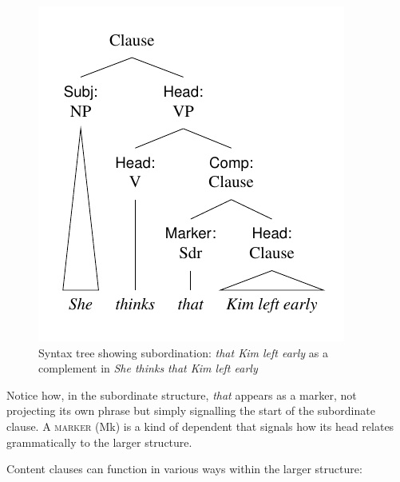 \begin{figure}
    \centering
    \includegraphics[width=0.55\linewidth]{figures/she thinks that kim left.pdf}
    \caption{Syntax tree showing subordination: \textit{that Kim left early} as a complement in \textit{She thinks that Kim left early}}\label{fig:sub-tree-sub}
\end{figure}
    

Notice how, in the subordinate structure, \textit{that} appears as a marker, not projecting its own phrase but simply signalling the start of the subordinate clause. A \textsc{marker} (Mk) is a kind of dependent that signals how its head relates grammatically to the larger structure.

Content clauses can function in various ways within the larger structure:

\ea \label{ex:content-funcs}
    \z
\z
{}

